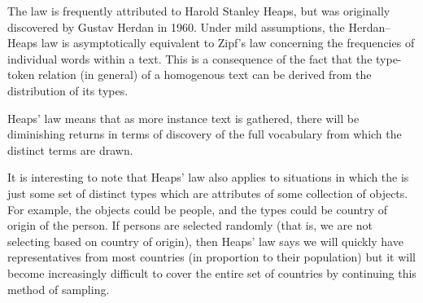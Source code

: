     The law is frequently attributed to Harold Stanley Heaps, but was originally discovered by Gustav Herdan in 1960.\cite{Egghe2007} Under mild assumptions, the Herdan–Heaps law is asymptotically equivalent to Zipf's law concerning the frequencies of individual words within a text.\cite{Kornai1999} This is a consequence of the fact that the type-token relation (in general) of a homogenous text can be derived from the distribution of its types.\cite{Milicka2009}

    Heaps' law means that as more instance text is gathered, there will be diminishing returns in terms of discovery of the full vocabulary from which the distinct terms are drawn.

    It is interesting to note that Heaps' law also applies to situations in which the  is just some set of distinct types which are attributes of some collection of objects. For example, the objects could be people, and the types could be country of origin of the person. If persons are selected randomly (that is, we are not selecting based on country of origin), then Heaps' law says we will quickly have representatives from most countries (in proportion to their population) but it will become increasingly difficult to cover the entire set of countries by continuing this method of sampling.
